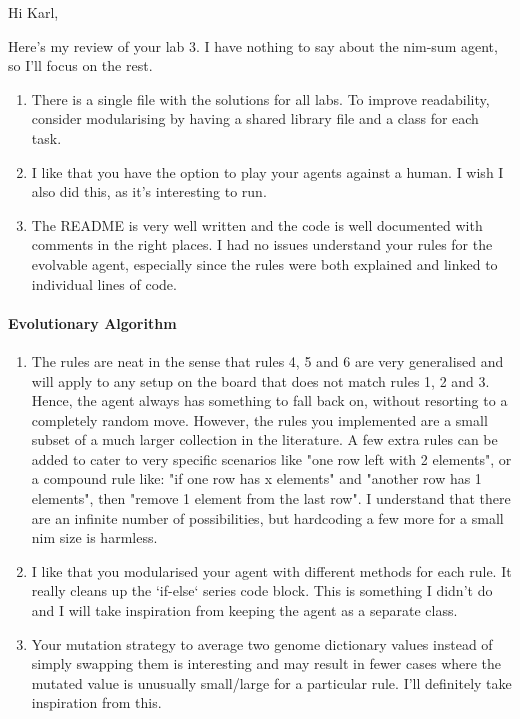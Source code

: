 Hi Karl,

Here's my review of your lab 3. I have nothing to say about the nim-sum agent, so I'll focus on the rest.

\begin{enumerate}
    \item There is a single file with the solutions for all labs. To improve readability, consider modularising by having a shared library file and a class for each task.
    \item I like that you have the option to play your agents against a human. I wish I also did this, as it's interesting to run.
    \item The README is very well written and the code is well documented with comments in the right places. I had no issues understand your rules for the evolvable agent, especially since the rules were both explained and linked to individual lines of code.
\end{enumerate}

\paragraph{Evolutionary Algorithm}

\begin{enumerate}
    \item The rules are neat in the sense that rules 4, 5 and 6 are very generalised and will apply to any setup on the board that does not match rules 1, 2 and 3. Hence, the agent always has something to fall back on, without resorting to a completely random move. However, the rules you implemented are a small subset of a much larger collection in the literature. A few extra rules can be added to cater to very specific scenarios like "one row left with 2 elements", or a compound rule like: "if one row has x elements" and "another row has 1 elements", then "remove 1 element from the last row". I understand that there are an infinite number of possibilities, but hardcoding a few more for a small nim size is harmless.
    \item I like that you modularised your agent with different methods for each rule. It really cleans up the `if-else` series code block. This is something I didn't do and I will take inspiration from keeping the agent as a separate class.
    \item Your mutation strategy to average two genome dictionary values instead of simply swapping them is interesting and may result in fewer cases where the mutated value is unusually small/large for a particular rule. I'll definitely take inspiration from this.
\end{enumerate}

